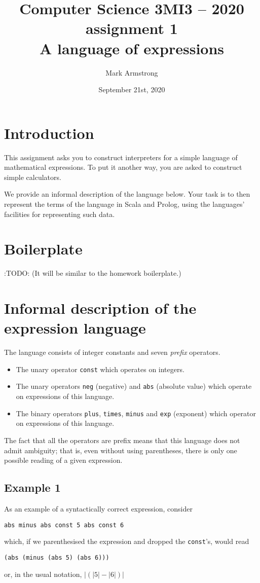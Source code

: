 \documentclass[11pt]{article}
\author{Mark Armstrong}
\date{September 21st, 2020}
\title{Computer Science 3MI3 – 2020 assignment 1\\\medskip
\large A language of expressions}
\begin{document}
\maketitle
\tableofcontents


\section*{Introduction}
\label{sec:orgef95b85}
This assignment asks you to construct interpreters
for a simple language of mathematical expressions.
To put it another way, you are asked to construct simple calculators.

We provide an informal description of the language below.
Your task is to then represent the terms of the language
in Scala and Prolog, using the languages' facilities for
representing such data.

\section*{Boilerplate}
\label{sec:org37bd73e}
:TODO: (It will be similar to the homework boilerplate.)

\section*{Informal description of the expression language}
\label{sec:orgc5d611e}
The language consists of integer constants and seven \emph{prefix} operators.
\begin{itemize}
\item The unary operator \texttt{const} which operates on integers.
\item The unary operators \texttt{neg} (negative) and \texttt{abs} (absolute value)
which operate on expressions of this language.
\item The binary operators \texttt{plus}, \texttt{times}, \texttt{minus} and \texttt{exp} (exponent)
which operator on expressions of this language.
\end{itemize}

The fact that all the operators are prefix
means that this language does not admit ambiguity;
that is, even without using parentheses,
there is only one possible reading of a given expression.

\subsection*{Example 1}
\label{sec:org88b7eed}
As an example of a syntactically correct expression, consider
\begin{verbatim}
abs minus abs const 5 abs const 6
\end{verbatim}
which, if we parenthesised the expression and dropped the \texttt{const}'s, would read
\begin{verbatim}
(abs (minus (abs 5) (abs 6)))
\end{verbatim}
or, in the usual notation,
$|(|5| - |6|)|$
\end{document}
